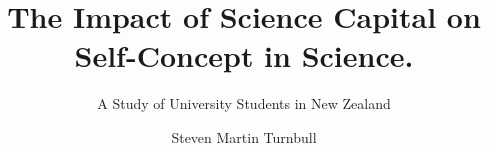 %
%
%
%
%
%
\RequirePackage{fix-cm}
%
\documentclass[smallextended]{svjour3}       %
%
\smartqed  %
%
\usepackage{graphicx}
\usepackage{rotating}
\usepackage{url}
%
%
%
%
%
\usepackage{afterpage}
\usepackage{csquotes}
\usepackage{lscape}


\title{The Impact of Science Capital on Self-Concept in Science.}


\subtitle{A Study of University Students in New Zealand}


\author{Steven Martin Turnbull        %
}

